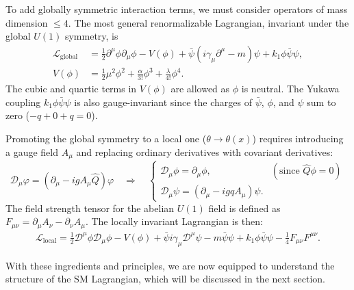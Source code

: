 To add globally symmetric interaction terms, we must consider operators of mass dimension $\leq 4$. The most general renormalizable Lagrangian, invariant under the global $U(1)$ symmetry, is
\begin{equation}
	\begin{aligned}
		\mathcal L_{\text{global}}&=\frac{1}{2} \partial^{\mu} \phi \partial_{\mu} \phi-V(\phi)+\bar{\psi}(i \gamma_\mu  \partial^\mu-m) \psi + k_1 \phi\bar\psi\psi,
		\\
		V(\phi)&=\frac{1}{2}\mu^2\phi^2 +\frac{\alpha}{3!}\phi^3+\frac{\lambda}{4!}\phi^4.
	\end{aligned}
\end{equation}
The cubic and quartic terms in $V(\phi)$ are allowed as $\phi$ is neutral. The Yukawa coupling $k_1 \phi\bar\psi\psi$ is also gauge-invariant since the charges of $\bar\psi$, $\phi$, and $\psi$ sum to zero ($-q + 0 + q = 0$).

Promoting the global symmetry to a local one ($\theta \to \theta(x)$) requires introducing a gauge field $A_\mu$ and replacing ordinary derivatives with covariant derivatives:
\begin{equation}
	\mathcal D_\mu\varphi=(\partial_{\mu}-i g A_\mu\hat Q )\varphi
	\quad\Longrightarrow\quad
	\begin{cases}
		\mathcal D_\mu\phi=\partial_\mu \phi, & (\text{since } \hat Q\phi=0)\\
		\mathcal D_\mu\psi=(\partial_\mu - i g q A_\mu) \psi.
	\end{cases}
\end{equation}
The field strength tensor for the abelian $U(1)$ field is defined as $F_{\mu\nu} = \partial_\mu A_\nu - \partial_\nu A_\mu$. The locally invariant Lagrangian is then:
\begin{multline}
	\mathcal L_{\text{local}}=\frac{1}{2} \mathcal D^{\mu} \phi \mathcal D_{\mu} \phi-V(\phi)
	+\bar{\psi}i \gamma_\mu  \mathcal D^{\mu} \psi - m \bar{\psi}\psi
	+ k_1 \phi\bar\psi\psi-\frac{1}{4} F_{\mu\nu}F^{\mu\nu}.
\end{multline}


With these ingredients and principles, we are now equipped to understand the structure of the SM Lagrangian, which will be discussed in the next section.

